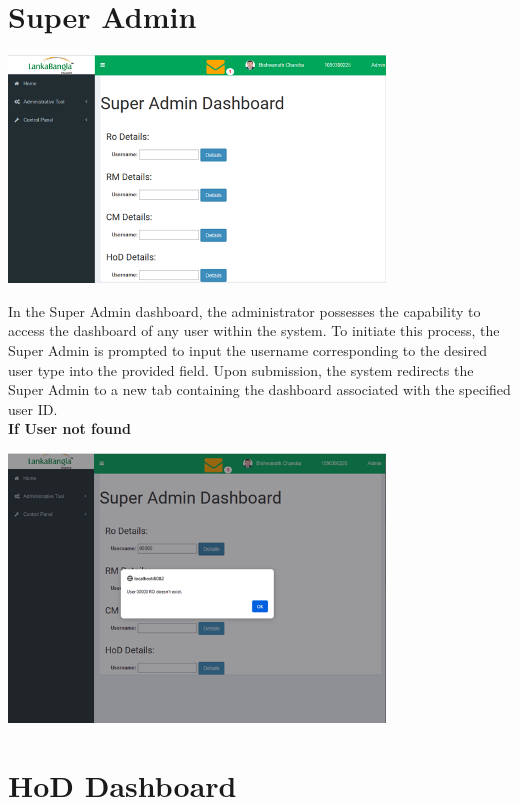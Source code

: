 \documentclass{article}
\begin{document}
\section{Super Admin}
\begin{center}
\includegraphics[width=0.75\textwidth]{image/super_admin.png}
\end{center}
In the Super Admin dashboard, the administrator possesses the capability to access the dashboard of any user within the system. To initiate this process, the Super Admin is prompted to input the username corresponding to the desired user type into the provided field. Upon submission, the system redirects the Super Admin to a new tab containing the dashboard associated with the specified user ID.\\

\textbf{If User not found}
\begin{center}
\includegraphics[width=0.75\textwidth]{image/super_admin_user_not_found.png}
\end{center}





\section{HoD Dashboard}
\end{document}
